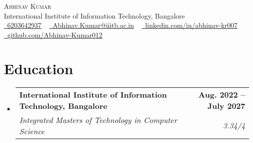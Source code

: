 \documentclass[letterpaper,11pt]{article}
\makeatletter
\newcommand{\resumeSubheading}[4]{
  \vspace{-2pt}\item
    \begin{tabular*}{1.0\textwidth}[t]{l@{\extracolsep{\fill}}r}
      \textbf{#1} & \textbf{\small #2} \\
      \textit{\small#3} & \textit{\small #4} \\
    \end{tabular*}\vspace{-7pt}
}
\newcommand{\resumeSubHeadingListStart}{\begin{itemize}[leftmargin=0.0in, label={}]}
\newcommand{\resumeSubHeadingListEnd}{\end{itemize}}
\makeatother
\begin{document}

\begin{center}
    {\Huge \scshape Abhinav Kumar} \\ \vspace{1pt}
    International Institute of Information Technology, Bangalore \\ \vspace{1pt}
    \small \href{tel:+916203642937}{\raisebox{-0.1\height}\faPhone\ 6203642937} ~ 
    \href{mailto:Abhinav.Kumar@iiitb.ac.in}{\raisebox{-0.2\height}\faEnvelope\  \underline{Abhinav.Kumar@iiitb.ac.in}} ~
    \href{https://www.linkedin.com/in/abhinav-kr007/}{\raisebox{-0.2\height}\faLinkedin\ \underline{linkedin.com/in/abhinav-kr007}} ~ 
    \href{https://github.com/Abhinav-Kumar012}{\raisebox{-0.2\height}\faGithub\ \underline{github.com/Abhinav-Kumar012}} 
    \vspace{-8pt}
\end{center}


\section{Education}
  \resumeSubHeadingListStart
    \resumeSubheading
      {International Institute of Information Technology, Bangalore}{Aug. 2022 -- July 2027}
      {Integrated Masters of Technology in Computer Science}{3.34/4}
  \resumeSubHeadingListEnd



\end{document}
